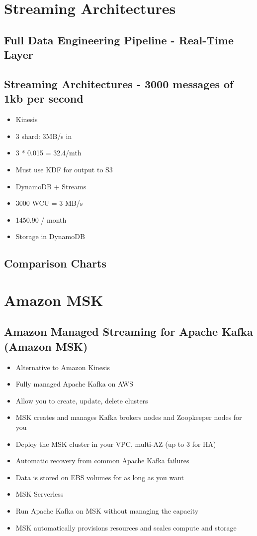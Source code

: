 \section{Streaming Architectures}

\subsection{Full Data Engineering Pipeline - Real-Time Layer}

\subsection{Streaming Architectures - 3000 messages of 1kb per second}
\begin{itemize}
    \item Kinesis
    \item 3 shard: 3MB/s in
    \item 3 * 0.015 = 32.4/mth
    \item Must use KDF for output to S3
    \item DynamoDB + Streams
    \item 3000 WCU = 3 MB/s
    \item 1450.90 / month
    \item Storage in DynamoDB
\end{itemize}

\subsection{Comparison Charts}


\section{Amazon MSK}

\subsection{Amazon Managed Streaming for Apache Kafka (Amazon MSK)}
\begin{itemize}
    \item Alternative to Amazon Kinesis
    \item Fully managed Apache Kafka on AWS
    \item Allow you to create, update, delete clusters
    \item MSK creates and manages Kafka brokers nodes and Zoopkeeper nodes for you
    \item Deploy the MSK cluster in your VPC, multi-AZ (up to 3 for HA)
    \item Automatic recovery from common Apache Kafka failures
    \item Data is stored on EBS volumes for as long as you want
    \item MSK Serverless
    \item Run Apache Kafka on MSK without managing the capacity
    \item MSK automatically provisions resources and scales compute and storage
\end{itemize}


